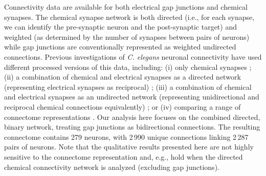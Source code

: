 \documentclass[10pt,letterpaper]{article}
\begin{document}
Connectivity data are available for both electrical gap junctions and chemical synapses.
The chemical synapse network is both directed (i.e., for each synapse, we can identify the pre-synaptic neuron and the post-synaptic target) and weighted (as determined by the number of synapses between pairs of neurons) while gap junctions are conventionally represented as weighted  undirected connections.
Previous investigations of \emph{C. elegans} neuronal connectivity have used different processed versions of this data, including:
(i) only chemical synapses \cite{Kashtan:2004ev};
(ii) a combination of chemical and electrical synapses as a directed network (representing electrical synapses as reciprocal) \cite{Azulay:2016cg, Kim:2016gl};
(iii) a combination of chemical and electrical synapses as an undirected network (representing unidirectional and reciprocal chemical connections equivalently) \cite{Towlson2013, Kim:2014bu, Pavlovic:2014gx, van2017guiding};
or (iv) comparing a range of connectome representations \cite{Pan:2010jt}.
Our analysis here focuses on the combined directed, binary network, treating gap junctions as bidirectional connections.
The resulting connectome contains 279 neurons, with 2\,990 unique connections linking 2\,287 pairs of neurons.
Note that the qualitative results presented here are not highly sensitive to the connectome representation and, e.g., hold when the directed chemical connectivity network is analyzed (excluding gap junctions).
\end{document}
